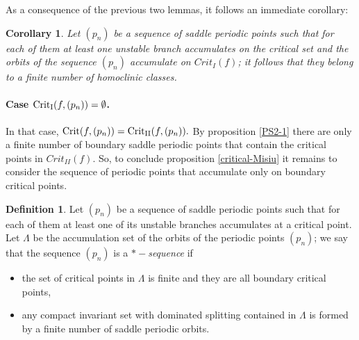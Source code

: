 \documentclass[a4paper,11pt]{article}
\newtheorem{corollary}[lemma]{Corollary}
\newtheorem{remark}[lemma]{Remark}
\theoremstyle{definition}
\newtheorem{definition}[lemma]{Definition}
\def\La{\Lambda}
\def\La{\Lambda}
\begin{document}

As a consequence of the previous two lemmas, it follows an immediate corollary:

\begin{corollary}\label{cor:crit1}
     Let $(p_n)$ be  a sequence of saddle periodic points such that for  each of them  at least one unstable branch accumulates on the critical set and  the orbits of the sequence $(p_n)$ accumulate on $Crit_I(f)$; it follows that  they belong to a finite number of homoclinic classes.
\end{corollary}




\paragraph{Case ${\rm Crit_I}(f, (p_n))=\emptyset$.} In that case, ${\rm Crit}(f, (p_n))= {\rm Crit_{II}}(f, (p_n)).$ By proposition \ref{PS2-1} there are only a finite number of boundary saddle periodic points that contain the critical points in $Crit_{II}(f).$  So, to conclude proposition \ref{critical-Misiu} it remains to consider the sequence of periodic points that accumulate only on boundary critical points.


\begin{definition}\label{def:*-seq}  
Let $(p_n)$ be a sequence of saddle periodic points such that for each of them at least one of its unstable branches accumulates at a critical point. Let $\La$ be the accumulation set of the orbits of the periodic points $(p_n)$; we say that the sequence $(p_n)$ is a {\it $*-$sequence} if 

\begin{itemize}
    \item[--] the set of critical points in $\La$ is finite and they are all boundary  critical points,

    \item[--] any  compact invariant set with dominated splitting  contained in $\La$ is formed by a finite number of saddle periodic orbits.
\end{itemize}


\end{definition}
\end{document}
